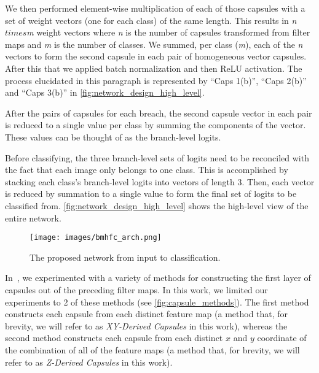 \documentclass{article}
\begin{document}
We then performed element-wise multiplication of each of those capsules with a set of weight vectors (one for each class) of the same length.  This results in \textit{n}\(times{}\)\textit{m} weight vectors where \textit{n} is the number of capsules transformed from filter maps and \textit{m} is the number of classes.  We summed, per class (\textit{m}), each of the \textit{n} vectors to form the second capsule in each pair of homogeneous vector capsules.  After this that we applied batch normalization and then ReLU activation.  The process elucidated in this paragraph is represented by ``Caps 1(b)'', ``Caps 2(b)'' and ``Caps 3(b)'' in \autoref{fig:network_design_high_level}.

After the pairs of capsules for each breach, the second capsule vector in each pair is reduced to a single value per class by summing the components of the vector.  These values can be thought of as the branch-level logits.

Before classifying, the three branch-level sets of logits need to be reconciled with the fact that each image only belongs to one class.  This is accomplished by stacking each class's branch-level logits into vectors of length 3.  Then, each vector is reduced by summation to a single value to form the final set of logits to be classified from.  \autoref{fig:network_design_high_level} shows the high-level view of the entire network.

\begin{figure}[!ht]
  \centering
  \texttt{[image: images/bmhfc\_arch.png]}
  \caption{The proposed network from input to classification.}\label{fig:network_design_high_level}
\end{figure}

In~\cite{Byerly2019}, we experimented with a variety of methods for constructing the first layer of capsules out of the preceding filter maps.  In this work, we limited our experiments to 2 of these methods (see \autoref{fig:capsule_methods}).  The first method constructs each capsule from each distinct feature map (a method that, for brevity, we will refer to as \textit{XY-Derived Capsules} in this work), whereas the second method constructs each capsule from each distinct \(x\) and \(y\) coordinate of the combination of all of the feature maps (a method that, for brevity, we will refer to as \textit{Z-Derived Capsules} in this work).
\end{document}
